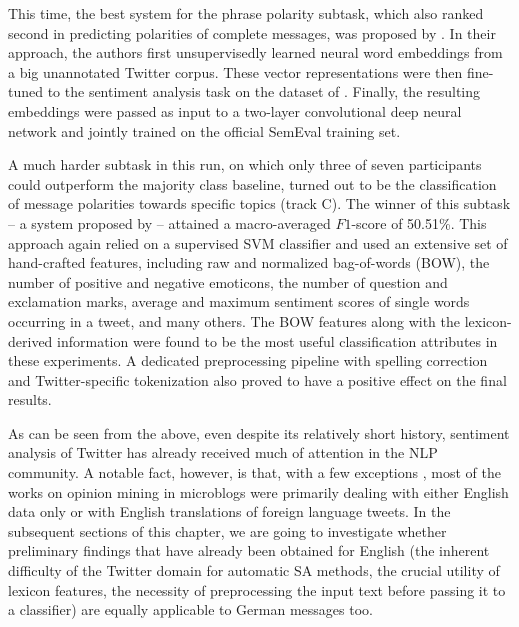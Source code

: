This time, the best system for the phrase polarity subtask, which also
ranked second in predicting polarities of complete messages, was
proposed by \citet{Severyn:15}.  In their approach, the authors first
unsupervisedly learned neural word embeddings from a big unannotated
Twitter corpus.  These vector representations were then fine-tuned to
the sentiment analysis task on the dataset of \citet{Go:09}.  Finally,
the resulting embeddings were passed as input to a two-layer
convolutional deep neural network and jointly trained on the official
SemEval training set.

A much harder subtask in this run, on which only three of seven
participants could outperform the majority class baseline, turned out
to be the classification of message polarities towards specific topics
(track C).  The winner of this subtask -- a system proposed by
\citet{Boag:15} -- attained a macro-averaged $F1$-score of 50.51\%.
This approach again relied on a supervised SVM classifier and used an
extensive set of hand-crafted features, including raw and normalized
bag-of-words (BOW), the number of positive and negative emoticons, the
number of question and exclamation marks, average and maximum
sentiment scores of single words occurring in a tweet, and many
others.  The BOW features along with the lexicon-derived information
were found to be the most useful classification attributes in these
experiments.  A dedicated preprocessing pipeline with spelling
correction and Twitter-specific tokenization also proved to have a
positive effect on the final results.

As can be seen from the above, even despite its relatively short
history, sentiment analysis of Twitter has already received much of
attention in the NLP community.  A notable fact, however, is that,
with a few exceptions \cite{Basile:13,Araque:15,Cesteros:15}, most of
the works on opinion mining in microblogs were primarily dealing with
either English data only or with English translations of foreign
language tweets.  In the subsequent sections of this chapter, we are
going to investigate whether preliminary findings that have already
been obtained for English (the inherent difficulty of the Twitter
domain for automatic SA methods, the crucial utility of lexicon
features, the necessity of preprocessing the input text before passing
it to a classifier) are equally applicable to German messages too.


